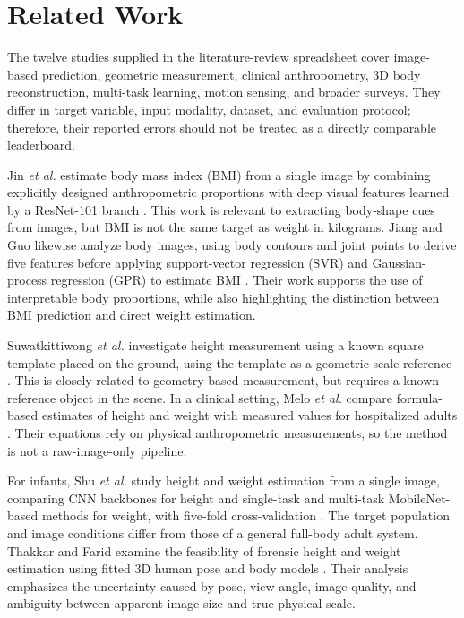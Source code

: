 \documentclass[conference]{IEEEtran}
\begin{document}
\section{Related Work}
The twelve studies supplied in the literature-review spreadsheet cover image-based prediction, geometric measurement, clinical anthropometry, 3D body reconstruction, multi-task learning, motion sensing, and broader surveys. They differ in target variable, input modality, dataset, and evaluation protocol; therefore, their reported errors should not be treated as a directly comparable leaderboard.

Jin \textit{et al.} estimate body mass index (BMI) from a single image by combining explicitly designed anthropometric proportions with deep visual features learned by a ResNet-101 branch \cite{jin2023}. This work is relevant to extracting body-shape cues from images, but BMI is not the same target as weight in kilograms. Jiang and Guo likewise analyze body images, using body contours and joint points to derive five features before applying support-vector regression (SVR) and Gaussian-process regression (GPR) to estimate BMI \cite{jiang2019}. Their work supports the use of interpretable body proportions, while also highlighting the distinction between BMI prediction and direct weight estimation.

Suwatkittiwong \textit{et al.} investigate height measurement using a known square template placed on the ground, using the template as a geometric scale reference \cite{suwat2018}. This is closely related to geometry-based measurement, but requires a known reference object in the scene. In a clinical setting, Melo \textit{et al.} compare formula-based estimates of height and weight with measured values for hospitalized adults \cite{melo2014}. Their equations rely on physical anthropometric measurements, so the method is not a raw-image-only pipeline.

For infants, Shu \textit{et al.} study height and weight estimation from a single image, comparing CNN backbones for height and single-task and multi-task MobileNet-based methods for weight, with five-fold cross-validation \cite{shu2023}. The target population and image conditions differ from those of a general full-body adult system. Thakkar and Farid examine the feasibility of forensic height and weight estimation using fitted 3D human pose and body models \cite{thakkar2021}. Their analysis emphasizes the uncertainty caused by pose, view angle, image quality, and ambiguity between apparent image size and true physical scale.
\end{document}

